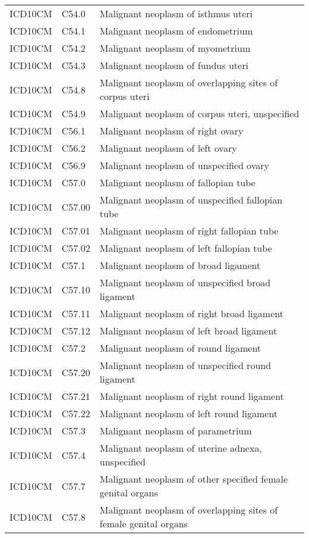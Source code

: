 \begin{longtable}{p{}p{}p{}}
  ICD10CM & C54.0 & Malignant neoplasm of isthmus uteri \\ 
  ICD10CM & C54.1 & Malignant neoplasm of endometrium \\ 
  ICD10CM & C54.2 & Malignant neoplasm of myometrium \\ 
  ICD10CM & C54.3 & Malignant neoplasm of fundus uteri \\ 
  ICD10CM & C54.8 & Malignant neoplasm of overlapping sites of corpus uteri \\ 
  ICD10CM & C54.9 & Malignant neoplasm of corpus uteri, unspecified \\ 
  ICD10CM & C56.1 & Malignant neoplasm of right ovary \\ 
  ICD10CM & C56.2 & Malignant neoplasm of left ovary \\ 
  ICD10CM & C56.9 & Malignant neoplasm of unspecified ovary \\ 
  ICD10CM & C57.0 & Malignant neoplasm of fallopian tube \\ 
  ICD10CM & C57.00 & Malignant neoplasm of unspecified fallopian tube \\ 
  ICD10CM & C57.01 & Malignant neoplasm of right fallopian tube \\ 
  ICD10CM & C57.02 & Malignant neoplasm of left fallopian tube \\ 
  ICD10CM & C57.1 & Malignant neoplasm of broad ligament \\ 
  ICD10CM & C57.10 & Malignant neoplasm of unspecified broad ligament \\ 
  ICD10CM & C57.11 & Malignant neoplasm of right broad ligament \\ 
  ICD10CM & C57.12 & Malignant neoplasm of left broad ligament \\ 
  ICD10CM & C57.2 & Malignant neoplasm of round ligament \\ 
  ICD10CM & C57.20 & Malignant neoplasm of unspecified round ligament \\ 
  ICD10CM & C57.21 & Malignant neoplasm of right round ligament \\ 
  ICD10CM & C57.22 & Malignant neoplasm of left round ligament \\ 
  ICD10CM & C57.3 & Malignant neoplasm of parametrium \\ 
  ICD10CM & C57.4 & Malignant neoplasm of uterine adnexa, unspecified \\ 
  ICD10CM & C57.7 & Malignant neoplasm of other specified female genital organs \\ 
  ICD10CM & C57.8 & Malignant neoplasm of overlapping sites of female genital organs \\ 

\end{longtable}
